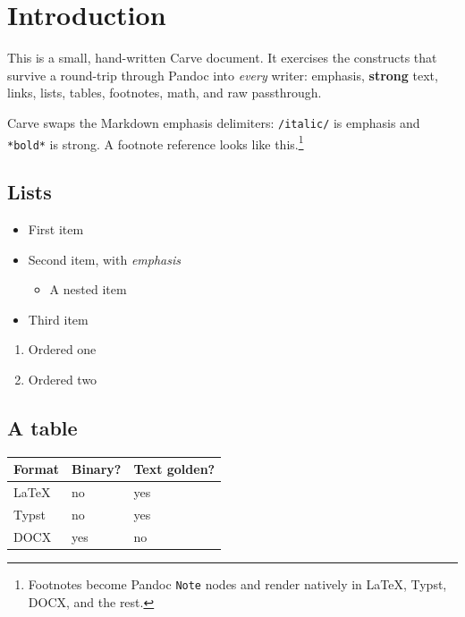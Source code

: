 \section{Introduction}\label{Introduction}

This is a small, hand-written Carve document. It exercises the
constructs that survive a round-trip through Pandoc into \emph{every}
writer: emphasis, \textbf{strong} text, links, lists, tables, footnotes,
math, and raw passthrough.

Carve swaps the Markdown emphasis delimiters: \texttt{/italic/} is
emphasis and \texttt{*bold*} is strong. A footnote reference looks like
this.{\footnote{Footnotes become Pandoc \texttt{Note} nodes and render
  natively in LaTeX, Typst, DOCX, and the rest.}}

\subsection{Lists}\label{Lists}

\begin{itemize}
\tightlist
\item
  First item
\item
  Second item, with \emph{emphasis}

  \begin{itemize}
  \tightlist
  \item
    A nested item
  \end{itemize}
\item
  Third item
\end{itemize}

\begin{enumerate}
\def\labelenumi{\arabic{enumi}.}
\tightlist
\item
  Ordered one
\item
  Ordered two
\end{enumerate}

\subsection{A table}\label{A-table}

{\def\LTcaptype{none} %
\begin{longtable}[]{@{}lll@{}}
\toprule\noalign{}
Format & Binary? & Text golden? \\
\midrule\noalign{}
\endhead
\bottomrule\noalign{}
\endlastfoot
LaTeX & no & yes \\
Typst & no & yes \\
DOCX & yes & no \\
\end{longtable}
}

